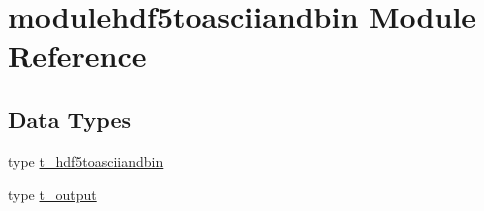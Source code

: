 \hypertarget{namespacemodulehdf5toasciiandbin}{}\section{modulehdf5toasciiandbin Module Reference}
\label{namespacemodulehdf5toasciiandbin}
\subsection*{Data Types}
\begin{DoxyCompactItemize}
\item 
type \mbox{\hyperlink{structmodulehdf5toasciiandbin_1_1t__hdf5toasciiandbin}{t\+\_\+hdf5toasciiandbin}}
\item 
type \mbox{\hyperlink{structmodulehdf5toasciiandbin_1_1t__output}{t\+\_\+output}}
\end{DoxyCompactItemize}
